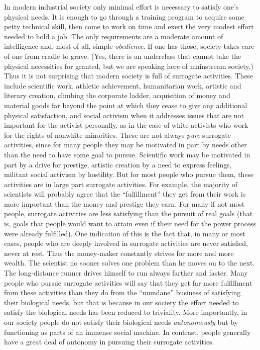  In modern industrial society only minimal effort is necessary to satisfy one’s physical needs. It is enough to go through a training program to acquire some petty technical skill, then come to work on time and exert the very modest effort needed to hold a job. The only requirements are a moderate amount of intelligence and, most of all, simple {\em obedience}. If one has those, society takes care of one from cradle to grave. (Yes, there is an underclass that cannot take the physical necessities for granted, but we are speaking here of mainstream society.) Thus it is not surprising that modern society is full of surrogate activities. These include scientific work, athletic achievement, humanitarian work, artistic and literary creation, climbing the corporate ladder, acquisition of money and material goods far beyond the point at which they cease to give any additional physical satisfaction, and social activism when it addresses issues that are not important for the activist personally, as in the case of white activists who work for the rights of nonwhite minorities. These are not always {\em pure} surrogate activities, since for many people they may be motivated in part by needs other than the need to have some goal to pursue. Scientific work may be motivated in part by a drive for prestige, artistic creation by a need to express feelings, militant social activism by hostility. But for most people who pursue them, these activities are in large part surrogate activities. For example, the majority of scientists will probably agree that the “fulfillment” they get from their work is more important than the money and prestige they earn.
 For many if not most people, surrogate activities are less satisfying than the pursuit of real goals (that is, goals that people would want to attain even if their need for the power process were already fulfilled). One indication of this is the fact that, in many or most cases, people who are deeply involved in surrogate activities are never satisfied, never at rest. Thus the money-maker constantly strives for more and more wealth. The scientist no sooner solves one problem than he moves on to the next. The long-distance runner drives himself to run always farther and faster. Many people who pursue surrogate activities will say that they get far more fulfillment from these activities than they do from the “mundane” business of satisfying their biological needs, but that is because in our society the effort needed to satisfy the biological needs has been reduced to triviality. More importantly, in our society people do not satisfy their biological needs {\em autonomously} but by functioning as parts of an immense social machine. In contrast, people generally have a great deal of autonomy in pursuing their surrogate activities.

